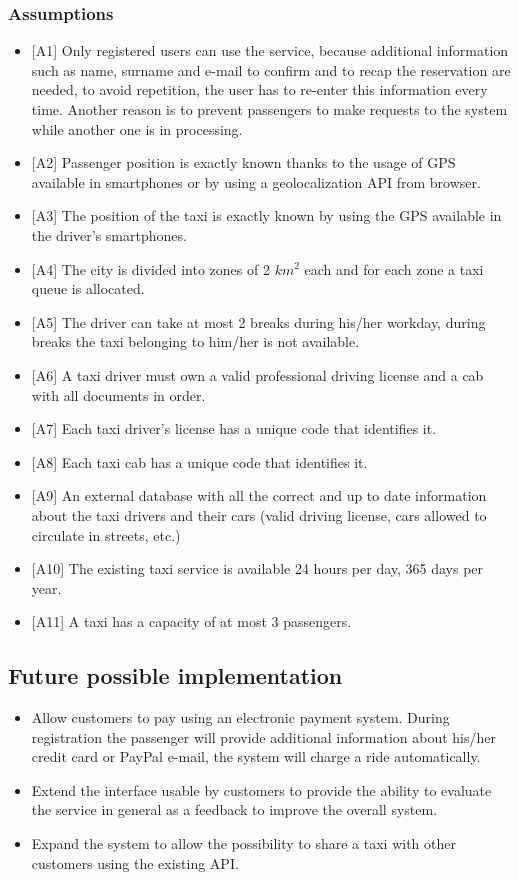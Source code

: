\documentclass[a4paper,12pt,dvipsnames]{article}%
\begin{document}
\subsubsection{Assumptions}
\begin{itemize}
\label{a1} \item {[}A1{]} Only registered users can use the service, because additional information such as name, surname and e-mail to confirm and to recap the reservation are needed, to avoid repetition, the user has to re-enter this information every time.
Another reason is to prevent passengers to make requests to the system while another one is in processing.
\label{a2} \item {[}A2{]} Passenger position is exactly known thanks to the usage of GPS available in smartphones or by using a geolocalization API from browser. 
\label{a3} \item {[}A3{]} The position of the taxi is exactly known by using the GPS available in the driver's smartphones.
\label{a4} \item {[}A4{]} The city is divided into zones of 2 $km^2$ each and for each zone a taxi queue is allocated.
\label{a5} \item {[}A5{]} The driver can take at most 2 breaks during his/her workday, during breaks the taxi belonging to him/her is not available.
\label{a6} \item {[}A6{]} A taxi driver must own a valid professional driving license and a cab with all documents in order.
\label{a7} \item {[}A7{]} Each taxi driver's license has a unique code that identifies it.
\label{a8} \item {[}A8{]} Each taxi cab has a unique code that identifies it.
\label{a9} \item {[}A9{]} An external database with all the correct and up to date information about the taxi drivers and their cars (valid driving license, cars allowed to circulate in streets, etc.)
\label{a10} \item {[}A10{]} The existing taxi service is available 24 hours per day, 365 days per year.
\label{a11} \item {[}A11{]} A taxi has a capacity of at most 3 passengers. 
\end{itemize}
\subsection{Future possible implementation}
\begin{itemize}
\item Allow customers to pay using an electronic payment system. During registration the passenger will provide additional information about his/her credit card or PayPal e-mail, the system will charge a ride automatically.
\item Extend the interface usable by customers to provide the ability to evaluate the service in general as a feedback to improve the overall system.
\item Expand the system to allow the possibility to share a taxi with other customers using the existing API.
\end{itemize}
\newpage
\end{document}
